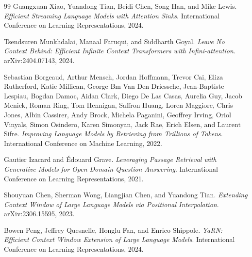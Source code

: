 \documentclass[preprint,12pt]{elsarticle}
\begin{document}
\begin{thebibliography}{99}
Guangxuan Xiao, Yuandong Tian, Beidi Chen, Song Han, and Mike Lewis.
\textit{Efficient Streaming Language Models with Attention Sinks}.
International Conference on Learning Representations, 2024.

Tsendsuren Munkhdalai, Manaal Faruqui, and Siddharth Goyal.
\textit{Leave No Context Behind: Efficient Infinite Context Transformers with Infini-attention}.
arXiv:2404.07143, 2024.

Sebastian Borgeaud, Arthur Mensch, Jordan Hoffmann, Trevor Cai, Eliza Rutherford, Katie Millican, George Bm Van Den Driessche, Jean-Baptiste Lespiau, Bogdan Damoc, Aidan Clark, Diego De Las Casas, Aurelia Guy, Jacob Menick, Roman Ring, Tom Hennigan, Saffron Huang, Loren Maggiore, Chris Jones, Albin Cassirer, Andy Brock, Michela Paganini, Geoffrey Irving, Oriol Vinyals, Simon Osindero, Karen Simonyan, Jack Rae, Erich Elsen, and Laurent Sifre.
\textit{Improving Language Models by Retrieving from Trillions of Tokens}.
International Conference on Machine Learning, 2022.

Gautier Izacard and \'{E}douard Grave.
\textit{Leveraging Passage Retrieval with Generative Models for Open Domain Question Answering}.
International Conference on Learning Representations, 2021.

Shouyuan Chen, Sherman Wong, Liangjian Chen, and Yuandong Tian.
\textit{Extending Context Window of Large Language Models via Positional Interpolation}.
arXiv:2306.15595, 2023.

Bowen Peng, Jeffrey Quesnelle, Honglu Fan, and Enrico Shippole.
\textit{YaRN: Efficient Context Window Extension of Large Language Models}.
International Conference on Learning Representations, 2024.

\end{thebibliography}
\end{document}

